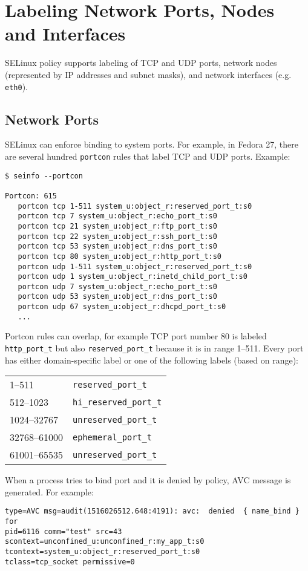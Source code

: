 \section{Labeling Network Ports, Nodes and Interfaces}
SELinux policy supports labeling of TCP and UDP ports, network nodes
(represented by IP addresses and subnet masks), and network interfaces (e.g.
\texttt{eth0}).

\subsection{Network Ports}
SELinux can enforce binding to system ports. For example, in Fedora 27, there
are several hundred \texttt{portcon} rules that label TCP and UDP ports.
Example:
\begin{lstlisting}
$ seinfo --portcon

Portcon: 615
   portcon tcp 1-511 system_u:object_r:reserved_port_t:s0
   portcon tcp 7 system_u:object_r:echo_port_t:s0
   portcon tcp 21 system_u:object_r:ftp_port_t:s0
   portcon tcp 22 system_u:object_r:ssh_port_t:s0
   portcon tcp 53 system_u:object_r:dns_port_t:s0
   portcon tcp 80 system_u:object_r:http_port_t:s0
   portcon udp 1-511 system_u:object_r:reserved_port_t:s0
   portcon udp 1 system_u:object_r:inetd_child_port_t:s0
   portcon udp 7 system_u:object_r:echo_port_t:s0
   portcon udp 53 system_u:object_r:dns_port_t:s0
   portcon udp 67 system_u:object_r:dhcpd_port_t:s0
   ...
\end{lstlisting}
Portcon rules can overlap, for example TCP port number 80 is labeled
\texttt{http\_port\_t} but also \texttt{reserved\_port\_t} because it is in range
1--511. Every port has either domain-specific label or one of the following
labels (based on range):

\begin{tabular}{l l}
    1--511 & \texttt{reserved\_port\_t} \\
    512--1023 & \texttt{hi\_reserved\_port\_t} \\
    1024--32767 & \texttt{unreserved\_port\_t} \\
    32768--61000 & \texttt{ephemeral\_port\_t} \\
    61001--65535 & \texttt{unreserved\_port\_t} \\
\end{tabular}

When a process tries to bind port and it is denied by policy, AVC message is
generated. For example:
\begin{lstlisting}
type=AVC msg=audit(1516026512.648:4191): avc:  denied  { name_bind } for
pid=6116 comm="test" src=43 scontext=unconfined_u:unconfined_r:my_app_t:s0
tcontext=system_u:object_r:reserved_port_t:s0
tclass=tcp_socket permissive=0
\end{lstlisting}

